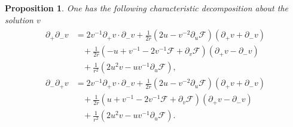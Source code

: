 \documentclass[10pt,leqno]{amsart}
\numberwithin{equation}{section}
\newtheorem{prop}{Proposition}[section]
\begin{document}
\begin{prop} \label{prop2}
	One has the following characteristic decomposition about the solution $v$
	\begin{equation} \label{character decompose prop}
		\begin{aligned}
			\begin{split}
				\partial_{+} \partial_{-} v &= 2 v^{-1} \partial_{+}v \cdot \partial_{-} v + \frac{1}{2r} (2u - v^{-2} \partial_{u} \mathcal{F}) \left(  \partial_{+} v + \partial_{-} v \right)  \\
				& \ \ \ \  + \frac{1}{2r} \left( -u+v^{-1}-2v^{-1} \mathcal{F} + \partial_{v} \mathcal{F} \right)  \left(  \partial_{+} v - \partial_{-} v \right) \\
				& \ \ \ \ + \frac{1}{r^{2}}\left( 2u^2 v - uv^{-1}\partial_{u} \mathcal{F} \right) ,\\
				\partial_{-} \partial_{+} v & = 2 v^{-1} \partial_{+}v \cdot \partial_{-} v + \frac{1}{2r} (2u - v^{-2} \partial_{u} \mathcal{F}) \left(  \partial_{+} v + \partial_{-} v \right)  \\
				& \ \ \ \  + \frac{1}{2r} \left( u+v^{-1}-2v^{-1} \mathcal{F} + \partial_{v} \mathcal{F} \right)  \left(  \partial_{+} v - \partial_{-} v \right) \\
				& \ \ \ \ + \frac{1}{r^{2}}\left( 2u^2 v - uv^{-1}\partial_{u} \mathcal{F} \right)  .				 
			\end{split}	
		\end{aligned}
	\end{equation}
	
\end{prop}
\end{document}
